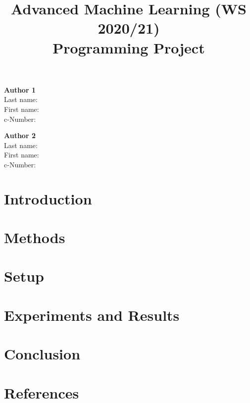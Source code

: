 \documentclass[11pt,a4paper]{article}
\title{\textbf{Advanced Machine Learning (WS 2020/21) \\Programming Project}}
\date{}
\begin{document}
\maketitle
\vspace{-3em}

\begin{tcolorbox}[
size=tight,
colback=white,
boxrule=0.2mm,
left=3mm,right=3mm, top=3mm, bottom=1mm
]
{\begin{multicols}{2}

\textbf{Author 1}       \\
Last name:              \\  %
First name:             \\  %
c-Number:               \\  %

\columnbreak

\textbf{Author 2}       \\
Last name:              \\  %
First name:             \\  %
c-Number:               \\  %

\end{multicols}}
\end{tcolorbox}


\section{Introduction}
\label{sec:intro}

\section{Methods}
\label{sec:methods}


\section{Setup}
\label{sec:setup}


\section{Experiments and Results}
\label{sec:exp}


\section{Conclusion}
\label{sec:con}


\section{References}
\end{document}
